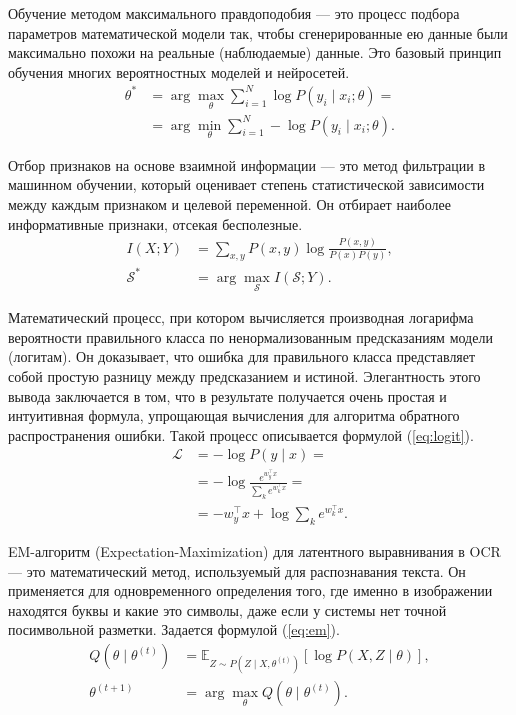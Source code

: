 \documentclass[14pt,a4paper]{extarticle}
\begin{document}
Обучение методом максимального правдоподобия — это процесс подбора параметров математической модели так, чтобы сгенерированные ею данные были максимально похожи на реальные (наблюдаемые) данные. Это базовый принцип обучения многих вероятностных моделей и нейросетей.
\begin{align*}
\theta^* &= \arg\max_{\theta} \sum_{i=1}^{N} \log P(y_i \mid x_i; \theta) = \\
&= \arg\min_{\theta} \sum_{i=1}^{N} -\log P(y_i \mid x_i; \theta).
\end{align*}

Отбор признаков на основе взаимной информации — это метод фильтрации в машинном обучении, который оценивает степень статистической зависимости между каждым признаком и целевой переменной. Он отбирает наиболее информативные признаки, отсекая бесполезные.
\begin{align*}
I(X;Y) &= \sum_{x,y} P(x,y)\log \frac{P(x,y)}{P(x)P(y)}, \\
\mathcal{S}^* &= \arg\max_{\mathcal{S}} I(\mathcal{S}; Y).
\end{align*}

Математический процесс, при котором вычисляется производная логарифма вероятности правильного класса по ненормализованным предсказаниям модели (логитам). Он доказывает, что ошибка для правильного класса представляет собой простую разницу между предсказанием и истиной. Элегантность этого вывода заключается в том, что в результате получается очень простая и интуитивная формула, упрощающая вычисления для алгоритма обратного распространения ошибки. Такой процесс описывается формулой (\ref{eq:logit}).
\begin{equation}
\begin{aligned}
\mathcal{L} &= -\log P(y \mid x) = \\
&= -\log \frac{e^{w_y^\top x}}{\sum_k e^{w_k^\top x}} = \\
&= - w_y^\top x + \log \sum_k e^{w_k^\top x}.
\end{aligned}
\label{eq:logit}
\end{equation}

EM-алгоритм (Expectation-Maximization) для латентного выравнивания в OCR — это математический метод, используемый для распознавания текста. Он применяется для одновременного определения того, где именно в изображении находятся буквы и какие это символы, даже если у системы нет точной посимвольной разметки. Задается формулой (\ref{eq:em}).
\begin{equation}
\begin{aligned}
Q(\theta \mid \theta^{(t)}) &=
\mathbb{E}_{Z \sim P(Z \mid X, \theta^{(t)})}
[\log P(X, Z \mid \theta)], \\
\theta^{(t+1)} &= \arg\max_{\theta} Q(\theta \mid \theta^{(t)}).
\end{aligned}
\label{eq:em}
\end{equation}
\end{document}
